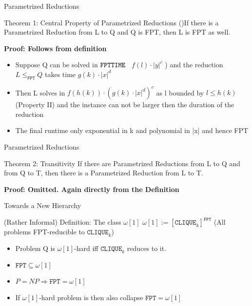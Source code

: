 \begin{frame}[c]{Parametrized Reductions}
\begin{center}
\begin{block}{Theorem 1: Central Property of Parametrized Reductions (\cite[Th. 13.2]{Cygan2015})}{If there is a Parametrized Reduction from L to Q and Q is FPT, then L is FPT as well. }
\end{block}
\end{center}
\textbf{Proof: Follows from definition} 
\begin{itemize}
    \pause\item Suppose Q can be solved in $\mathtt{FPT\-TIME}$~ $f(l) \cdot |y|^c$ ) and the reduction $L \leq_{\mathtt{FPT}} Q$ takes time $g(k) \cdot |x|^d$
    \pause\item Then L solves in $f(h(k)) \cdot (g(k) \cdot |x|^d)^c$ as  l bounded by $l \leq h(k)$ (Property II) and the instance can not be larger then the duration of the reduction
    \item The final runtime only exponential in k and polynomial in |x| and hence FPT \QEDA
    \end{itemize}
\end{frame}

\begin{frame}[c]{Parametrized Reductions}
\begin{center}
\begin{block}{Theorem 2: Transitivity \cite[Th. 13.3]{Cygan2015}}
If there are Parametrized Reductions from  L to Q and from Q to T, then there is a Parametrized Reduction from L to T.
\end{block}
    \textbf{Proof: Omitted. Again directly from the Definition}
\end{center}
\end{frame}

\begin{frame}[c]{Towards a New Hierarchy}
\begin{center}
\begin{block}{(Rather Informal) Definition: The class $\omega[1]$}
$\omega[1] := [\mathtt{CLIQUE}_k]^{\mathtt{FPT}}$ (All problems FPT-reducible to $\mathtt{CLIQUE}_k$)
\end{block}
\begin{itemize}
    \pause\item Problem Q is $\omega[1]$-hard iff $\mathtt{CLIQUE}_k$ reduces to it.
    \pause\item $\mathtt{FPT} \subseteq \omega[1]$
    \pause\item $P = NP \Rightarrow \mathtt{FPT} = \omega[1]$
    \pause\item If $\omega[1]$-hard problem is  then also collapse $\mathtt{FPT} =  \omega[1]$
\end{itemize}
\end{center}
\end{frame}

